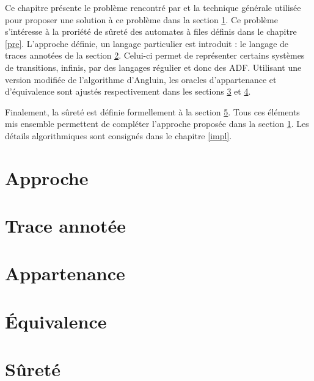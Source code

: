 Ce chapitre présente le problème rencontré par \cite{Vardhan04} et la technique générale utilisée pour proposer une solution à ce problème dans la section \ref{app}. Ce problème s'intéresse à la proriété de sûreté des automates à files définis dans le chapitre \ref{pre}. L'approche définie, un langage particulier est introduit : le langage de traces annotées de la section \ref{trace}. Celui-ci permet de représenter certains systèmes de transitions, infinis, par des langages régulier et donc des ADF. Utilisant une version modifiée de l'algorithme d'Angluin, les oracles d'appartenance et d'équivalence sont ajustés respectivement dans les sections \ref{mem} et \ref{eq}.

Finalement, la sûreté est définie formellement à la section \ref{safety}. Tous ces éléments mis ensemble permettent de compléter l'approche proposée dans la section \ref{app}. Les détails algorithmiques sont consignés dans le chapitre \ref{impl}.


\section{Approche}\label{app}
\section{Trace annotée}\label{trace}
\section{Appartenance}\label{mem}
\section{Équivalence}\label{eq}
\section{Sûreté}\label{safety}
